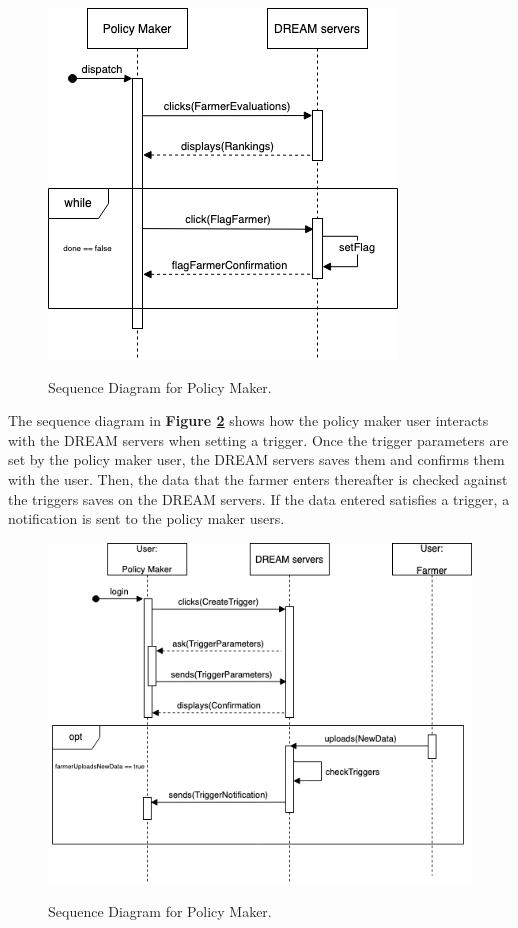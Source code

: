\begin{figure}[hbt!]
\centering
\includegraphics[scale=0.6]{Files/sequence_disgrams/thePNGs/policy_setFlag.png}\\
\caption{\label{fig:policySeqSetFlag}Sequence Diagram for Policy Maker.}
\end{figure}



\begin{flushleft}
The sequence diagram in \textbf{Figure \ref{fig:policySeqSetTrig}} shows how the policy maker user interacts with the DREAM servers when setting a trigger. Once the trigger parameters are set by the policy maker user, the DREAM servers saves them and confirms them with the user. Then, the data that the farmer enters thereafter is checked against the triggers saves on the DREAM servers. If the data entered satisfies a trigger, a notification is sent to the policy maker users.
\end{flushleft}

\begin{figure}[hbt!]
\centering
\includegraphics[scale=0.6]{Files/sequence_disgrams/thePNGs/policy_setTrigger.png}\\
\caption{\label{fig:policySeqSetTrig}Sequence Diagram for Policy Maker.}
\end{figure}


